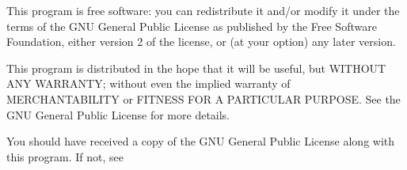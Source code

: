 
This program is free software: you can redistribute it and/or modify
it under the terms of the GNU General Public License as published by
the Free Software Foundation, either version 2 of the license, or
(at your option) any later version.

This program is distributed in the hope that it will be useful,
but WITHOUT ANY WARRANTY; without even the implied warranty of
MERCHANTABILITY or FITNESS FOR A PARTICULAR PURPOSE.  See the
GNU General Public License for more details.

You should have received a copy of the GNU General Public License
along with this program. If not, see 

